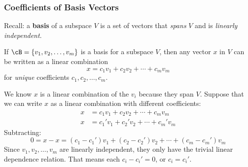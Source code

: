 

\usetikzlibrary{matrix}




\begin{frame}
\frametitle{Coefficients of Basis Vectors}

\alert{Recall:} a \textbf{basis} of a subspace $V$ is a set of vectors that
\emph{spans} $V$ and is \emph{linearly independent}.

\pause
\begin{oneoffthm}{}
  \pause
  If $\cB = \{v_1,v_2,\ldots,v_m\}$ is a basis for a subspace $V$, then any
  vector $x$ in $V$ can be written as a linear combination
  \[ x = c_1v_1 + c_2v_2 + \cdots + c_mv_m \]
  for \emph{unique} coefficients $c_1,c_2,\ldots,c_m$.
\end{oneoffthm}

\begin{webonly}
We know $x$ is a linear combination of the $v_i$ because they span $V$.
Suppose that we can write $x$ as a linear combination with different
coefficients:
\[\begin{split}
  x &= c_1v_1 + c_2v_2 + \cdots + c_mv_m \\
  x &= c_1'v_1 + c_2'v_2 + \cdots + c_m'v_m
\end{split}\]
Subtracting:
\[ 0 = x-x = (c_1-c_1')v_1 + (c_2-c_2')v_2 + \cdots + (c_m-c_m')v_m \]
Since $v_1,v_2,\ldots,v_m$ are linearly independent, they only have the trivial
linear dependence relation.
That means each $c_i-c_i'=0$, or $c_i=c_i'$.
\end{webonly}

\end{frame}



